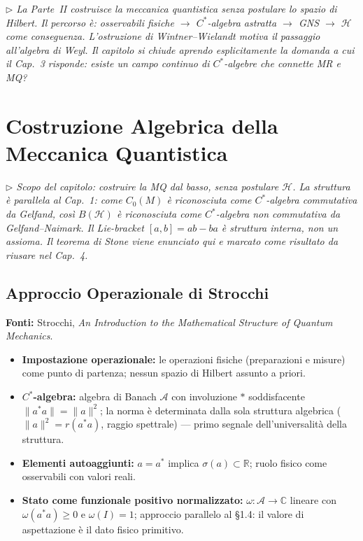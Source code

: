 \documentclass[12pt, a4paper]{article}
\newcommand{\fonti}[1]{%
	\begin{fontebox}
		\textcolor{fontecolor}{\footnotesize\textbf{Fonti:} #1}
	\end{fontebox}%
}
\newcommand{\nota}[1]{%
	\par\smallskip
	\noindent\textit{\small $\triangleright$\; #1}
	\par\smallskip
}
\begin{document}
	\nota{La Parte~II costruisce la meccanica quantistica senza postulare lo spazio di Hilbert.
		Il percorso è: osservabili fisiche $\to$ $C^*$-algebra astratta $\to$ GNS $\to$
		$\mathcal{H}$ come conseguenza. L'ostruzione di Wintner--Wielandt motiva il passaggio
		all'algebra di Weyl. Il capitolo si chiude aprendo esplicitamente la domanda a cui il
		Cap.\ 3 risponde: esiste un campo continuo di $C^*$-algebre che connette MR e MQ?}
	
	\section{Costruzione Algebrica della Meccanica Quantistica}
	
	\nota{Scopo del capitolo: costruire la MQ dal basso, senza postulare $\mathcal{H}$.
		La struttura è parallela al Cap.\ 1: come $C_0(M)$ è riconosciuta come $C^*$-algebra
		commutativa da Gelfand, così $B(\mathcal{H})$ è riconosciuta come $C^*$-algebra
		non commutativa da Gelfand--Naimark. Il Lie-bracket $[a,b] = ab-ba$ è struttura
		interna, non un assioma. Il teorema di Stone viene enunciato qui e marcato come
		risultato da riusare nel Cap.\ 4.}
	
	\subsection{Approccio Operazionale di Strocchi}
	
	\fonti{Strocchi, \textit{An Introduction to the Mathematical Structure of Quantum Mechanics}.}
	
	\begin{itemize}
		\item \textbf{Impostazione operazionale:} le operazioni fisiche (preparazioni e misure)
		come punto di partenza; nessun spazio di Hilbert assunto a priori.
		\item \textbf{$C^*$-algebra:} algebra di Banach $\mathcal{A}$ con involuzione $*$
		soddisfacente $\|a^*a\| = \|a\|^2$; la norma è determinata dalla sola struttura
		algebrica ($\|a\|^2 = r(a^*a)$, raggio spettrale) --- primo segnale dell'universalità
		della struttura.
		\item \textbf{Elementi autoaggiunti:} $a = a^*$ implica $\sigma(a) \subset \mathbb{R}$;
		ruolo fisico come osservabili con valori reali.
		\item \textbf{Stato come funzionale positivo normalizzato:} $\omega: \mathcal{A}
		\to \mathbb{C}$ lineare con $\omega(a^*a) \geq 0$ e $\omega(I) = 1$; approccio
		parallelo al §1.4: il valore di aspettazione è il dato fisico primitivo.
	\end{itemize}
	
\end{document}
